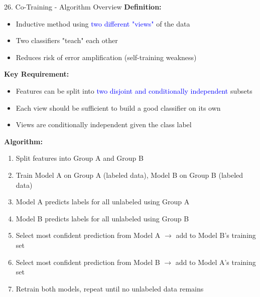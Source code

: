 \documentclass[8pt]{beamer}
\begin{document}
	\begin{frame}{26. Co-Training - Algorithm Overview}
		\fontsize{6.5}{7.5}\selectfont
		\textbf{Definition:}
		\begin{itemize}
			\item Inductive method using \textcolor{blue}{two different "views"} of the data
			\item Two classifiers "teach" each other
			\item Reduces risk of error amplification (self-training weakness)
		\end{itemize}
		
		\textbf{Key Requirement:}
		\begin{itemize}
			\item Features can be split into \textcolor{blue}{two disjoint and conditionally independent} subsets
			\item Each view should be sufficient to build a good classifier on its own
			\item Views are conditionally independent given the class label
		\end{itemize}
		
		\textbf{Algorithm:}
		\begin{enumerate}
			\item Split features into Group A and Group B
			\item Train Model A on Group A (labeled data), Model B on Group B (labeled data)
			\item Model A predicts labels for all unlabeled using Group A
			\item Model B predicts labels for all unlabeled using Group B
			\item Select most confident prediction from Model A $\rightarrow$ add to Model B's training set
			\item Select most confident prediction from Model B $\rightarrow$ add to Model A's training set
			\item Retrain both models, repeat until no unlabeled data remains
		\end{enumerate}
	\end{frame}
	
\end{document}
